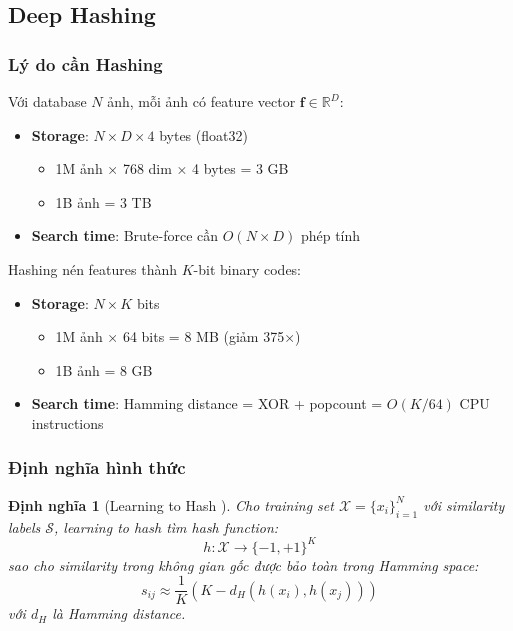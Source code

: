 \documentclass[12pt,a4paper]{article}
\newtheorem{definition}{Định nghĩa}[section]
\begin{document}
\subsection{Deep Hashing}

\subsubsection{Lý do cần Hashing}

Với database $N$ ảnh, mỗi ảnh có feature vector $\mathbf{f} \in \mathbb{R}^D$:

\begin{itemize}
    \item \textbf{Storage}: $N \times D \times 4$ bytes (float32)
    \begin{itemize}
        \item 1M ảnh × 768 dim × 4 bytes = 3 GB
        \item 1B ảnh = 3 TB
    \end{itemize}
    \item \textbf{Search time}: Brute-force cần $O(N \times D)$ phép tính
\end{itemize}

Hashing nén features thành $K$-bit binary codes:

\begin{itemize}
    \item \textbf{Storage}: $N \times K$ bits
    \begin{itemize}
        \item 1M ảnh × 64 bits = 8 MB (giảm 375×)
        \item 1B ảnh = 8 GB
    \end{itemize}
    \item \textbf{Search time}: Hamming distance = XOR + popcount = $O(K/64)$ CPU instructions
\end{itemize}

\subsubsection{Định nghĩa hình thức}

\begin{definition}[Learning to Hash \cite{wang2018survey}]
Cho training set $\mathcal{X} = \{x_i\}_{i=1}^N$ với similarity labels $\mathcal{S}$, learning to hash tìm hash function:
\begin{equation}
    h: \mathcal{X} \rightarrow \{-1, +1\}^K
\end{equation}
sao cho similarity trong không gian gốc được bảo toàn trong Hamming space:
\begin{equation}
    s_{ij} \approx \frac{1}{K}(K - d_H(h(x_i), h(x_j)))
\end{equation}
với $d_H$ là Hamming distance.
\end{definition}
\end{document}
